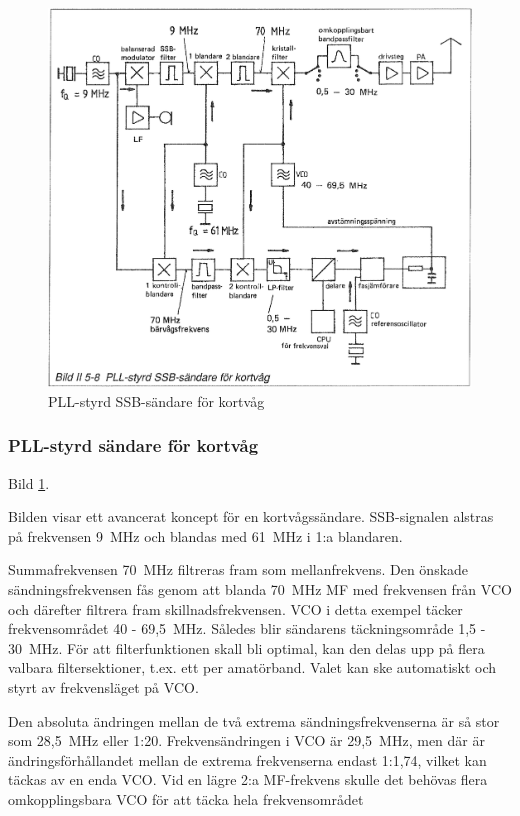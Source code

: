 \begin{figure}
  \includegraphics[width=\textwidth]{images/bild_2_5-08}
  \caption{PLL-styrd SSB-sändare för kortvåg}
  \label{fig:bildII5-8}
\end{figure}

\subsubsection{PLL-styrd sändare för kortvåg}

Bild \ref{fig:bildII5-8}.

Bilden visar ett avancerat koncept för en kortvågssändare.
SSB-signalen alstras på frekvensen 9~MHz och blandas med 61~MHz i 1:a
blandaren.

Summafrekvensen 70~MHz filtreras fram som mellanfrekvens. Den önskade
sändningsfrekvensen fås genom att blanda 70~MHz MF med frekvensen från
VCO och därefter filtrera fram skillnadsfrekvensen.  VCO i detta
exempel täcker frekvensområdet 40 - 69,5~MHz. Således blir sändarens
täckningsområde 1,5 - 30~MHz. För att filterfunktionen skall bli
optimal, kan den delas upp på flera valbara filtersektioner, t.ex. ett
per amatörband. Valet kan ske automatiskt och styrt av frekvensläget
på VCO.

Den absoluta ändringen mellan de två extrema sändningsfrekvenserna är
så stor som 28,5~MHz eller 1:20. Frekvensändringen i VCO är 29,5~MHz,
men där är ändringsförhållandet mellan de extrema frekvenserna endast
1:1,74, vilket kan täckas av en enda VCO. Vid en lägre 2:a MF-frekvens
skulle det behövas flera omkopplingsbara VCO för att täcka hela
frekvensområdet

